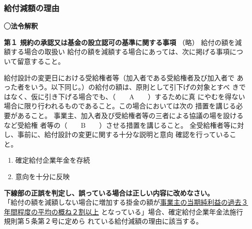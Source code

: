\subsubsection{給付減額の理由}

\begin{fillblank}[年金1 \ 2022 \ 問題1(1)アイ]

  \noindent \textbf{◯法令解釈}
  \begin{lawstructure}
    \begin{lawarticle}{}{}
      \textbf{第１ 規約の承認又は基金の設立認可の基準に関する事項}
       （略）
      給付の額を減額する場合の取扱い
      給付の額を減額する場合にあっては、次に掲げる事項について留意すること。
        
        給付設計の変更日における受給権者等（加入者である受給権者及び加入者で
あった者をいう。以下同じ。）の給付の額は、原則として引下げの対象とすべ
きではなく、仮に引き下げる場合でも、（　　A　　）するために真
にやむを得ない場合に限り行われるものであること。この場合においては次の
措置を講じる必要があること。
        事業主、加入者及び受給権者等の三者による協議の場を設けるなど受給権
者等の（　　B　　）させる措置を講じること。
        全受給権者等に対し、事前に、給付設計の変更に関する十分な説明と意向
確認を行っていること。

    \end{lawarticle}
  \end{lawstructure}

\end{fillblank}


\begin{answerbox}
  \begin{enumerate}[A:]
    \item 確定給付企業年金を存続
    \item 意向を十分に反映
  \end{enumerate}
\end{answerbox}

\begin{truefalse}[年金1 \ 2023 \ 問題1(3)(ウ)]
  \textbf{下線部の正誤を判定し、誤っている場合は正しい内容に改めなさい。}
\\

  「給付の額を減額しない場合に増加する掛金の額が\underline{事業主の当期純利益の過去３年間程度の平均の概ね２割以上}
  となっている」場合、確定給付企業年金法施行規則第５条第２号に定めら
れている給付減額の理由に該当する。
\end{truefalse}


